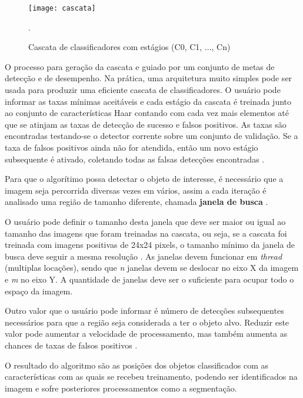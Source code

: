  \begin{figure}[h]
	\centering
	\texttt{[image: cascata]}
	\caption{Cascata de classificadores com estágios (C0, C1, ..., Cn)}.
	\label{fig:cascata}
\end{figure}

O processo para geração da cascata e guiado por um conjunto de metas de detecção e de desempenho. Na prática, uma arquitetura muito simples pode ser usada para produzir uma eficiente cascata de classificadores. O usuário pode informar as taxas mínimas aceitáveis e cada estágio da cascata é treinada junto ao conjunto de características Haar contando com cada vez mais elementos até que se atinjam as taxas de detecção de sucesso e falsos positivos. As taxas são encontradas testando-se o detector corrente sobre um conjunto de validação. Se a taxa de falsos positivos ainda não for atendida, então um novo estágio subsequente é ativado, coletando todas as falsas detecções encontradas \cite{gustavo_cascata}.

Para que o algorítimo possa detectar o objeto de interesse, é necessário que a imagem seja percorrida diversas vezes em vários, assim a cada iteração é analisado uma região de tamanho diferente, chamada \textbf{janela de busca} \cite{gustavo_cascata}. 

O usuário pode definir o tamanho desta janela que deve ser maior ou igual ao tamanho das imagens que foram treinadas na cascata, ou seja, se a cascata foi treinada com imagens positivas de 24x24 pixels, o tamanho mínimo da janela de busca deve seguir a mesma resolução \cite{gustavo_cascata}. As janelas devem funcionar em \textit{thread} (multiplas locações), sendo que \textit{n} janelas devem se deslocar no eixo X da imagem e \textit{m} no eixo Y. A quantidade de janelas deve ser o suficiente para ocupar todo o espaço da imagem.

Outro valor que o usuário pode informar é número de detecções subsequentes necessários para que a região seja considerada a ter o objeto alvo. Reduzir este valor pode aumentar a velocidade de processamento, mas também aumenta as chances de taxas de falsos positivos \cite{drmathew_java_programming}.

O resultado do algoritmo são as posições dos objetos classificados com as características com as quais se recebeu treinamento, podendo ser identificados na imagem e sofre posteriores processamentos como a segmentação.




